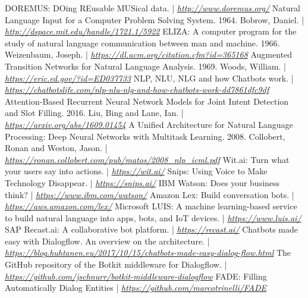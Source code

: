 \documentclass[a4paper,12pt]{report}
\begin{document}
	\begin{thebibliography}{9}
		 DOREMUS: DOing REusable MUSical data. | \textit{\href{http://www.doremus.org/}{http://www.doremus.org/}}
		 Natural Language Input for a Computer Problem Solving System. 1964. Bobrow, Daniel. | \textit{\href{http://dspace.mit.edu/handle/1721.1/5922}{http://dspace.mit.edu/handle/1721.1/5922}}
		 ELIZA: A computer program for the study of natural language communication between man and machine. 1966. Weizenbaum, Joseph. | \textit{\href{https://dl.acm.org/citation.cfm?id=365168}{https://dl.acm.org/citation.cfm?id=365168}}
		 Augmented Transition Networks for Natural Language Analysis. 1969. Woods, William. | \textit{\href{https://eric.ed.gov/?id=ED037733}{https://eric.ed.gov/?id=ED037733}}
		 NLP, NLU, NLG and how Chatbots work. | \textit{\href{https://chatbotslife.com/nlp-nlu-nlg-and-how-chatbots-work-dd7861dfc9df}{https://chatbotslife.com/nlp-nlu-nlg-and-how-chatbots-work-dd7861dfc9df}}
		 Attention-Based Recurrent Neural Network Models for Joint Intent Detection and Slot Filling. 2016. Liu, Bing and Lane, Ian. | \textit{\href{https://arxiv.org/abs/1609.01454}{https://arxiv.org/abs/1609.01454}}
		 A Unified Architecture for Natural Language Processing: Deep Neural Networks with Multitask Learning. 2008. Collobert, Ronan and Weston, Jason. | \textit{\href{https://ronan.collobert.com/pub/matos/2008\_nlp\_icml.pdf}{https://ronan.collobert.com/pub/matos/2008\_nlp\_icml.pdf}}
		 Wit.ai: Turn what your users say into actions. | \textit{\href{https://wit.ai/}{https://wit.ai/}}
		 Snips: Using Voice to Make Technology Disappear. | \textit{\href{https://snips.ai/}{https://snips.ai/}}
		 IBM Watson: Does your business think? | \textit{\href{https://www.ibm.com/watson/}{https://www.ibm.com/watson/}}
		 Amazon Lex: Build conversation bots. | \textit{\href{https://aws.amazon.com/lex/}{https://aws.amazon.com/lex/}}
		 Microsoft LUIS: A machine learning-based service to build natural language into apps, bots, and IoT devices. | \textit{\href{https://www.luis.ai/}{https://www.luis.ai/}}
		 SAP Recast.ai: A collaborative bot platform. | \textit{\href{https://recast.ai/}{https://recast.ai/}}
		 Chatbots made easy with Dialogflow. An overview on the architecture. | \textit{\href{https://blog.huhtanen.eu/2017/10/15/chatbots-made-easy-dialog-flow.html}{https://blog.huhtanen.eu/2017/10/15/chatbots-made-easy-dialog-flow.html}}
		 The GitHub repository of the Botkit middleware for Dialogflow. | \textit{\href{https://github.com/jschnurr/botkit-middleware-dialogflow}{https://github.com/jschnurr/botkit-middleware-dialogflow}}
		 FADE: Filling Automatically Dialog Entities | \textit{\href{https://github.com/marcotrinelli/FADE}{https://github.com/marcotrinelli/FADE}}
	\end{thebibliography}
\end{document}
